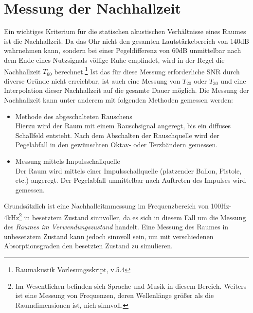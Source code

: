 \documentclass[11pt]{report}
\begin{document}


%

\newpage
\tableofcontents  

%




\listoffigures 


\pagestyle{headings}


\chapter{Messung der Nachhallzeit}
Ein wichtiges Kriterium f\"ur die statischen akustischen Verh\"altnisse eines Raumes ist die Nachhallzeit. Da das Ohr nicht den gesamten Lautst\"arkebereich von 140dB wahrnehmen kann, sondern bei einer Pegeldifferenz von 60dB unmittelbar nach dem Ende eines Nutzsignals v\"ollige Ruhe empfindet, wird in der Regel die Nachhallzeit $T_{60}$ berechnet.\footnote{Raumakustik Vorlesungsskript, v.5.4}  Ist das f\"ur diese Messung erforderliche SNR durch diverse Gr\"unde nicht erreichbar, ist auch eine Messung von $T_{20}$ oder $T_{30}$ und eine Interpolation dieser Nachhallzeit auf die gesamte Dauer m\"oglich. Die Messung der Nachhallzeit kann unter anderem mit folgenden Methoden gemessen werden:
\begin{itemize}
\item Methode des abgeschalteten Rauschens\\
Hierzu wird der Raum mit einem Rauschsignal angeregt, bis ein diffuses Schallfeld entsteht. Nach dem Abschalten der Rauschquelle wird der Pegelabfall in den gew\"unschten Oktav- oder Terzb\"andern gemessen.
\item Messung mittels Impulsschallquelle\\
Der Raum wird mittels einer Impulsschallquelle (platzender Ballon, Pistole, etc.) angeregt. Der Pegelabfall unmittelbar nach Auftreten des Impulses wird gemessen.
\end{itemize}
Grunds\"atzlich ist eine Nachhalleitmmessung im Frequenzbereich von 100Hz-4kHz\footnote{Im Wesentlichen befinden sich Sprache und Musik in diesem Bereich. Weiters ist eine Messung von Frequenzen, deren Wellenl\"ange gr\"o\ss er als die Raumdimensionen ist, nich sinnvoll.} in besetztem Zustand sinnvoller, da es sich in diesem Fall um die Messung des \textit{Raumes im Verwendungszustand} handelt. Eine Messung des Raumes in unbesetztem Zustand kann jedoch sinnvoll sein, um mit verschiedenen Absorptionsgraden den besetzten Zustand zu simulieren.
\end{document}
